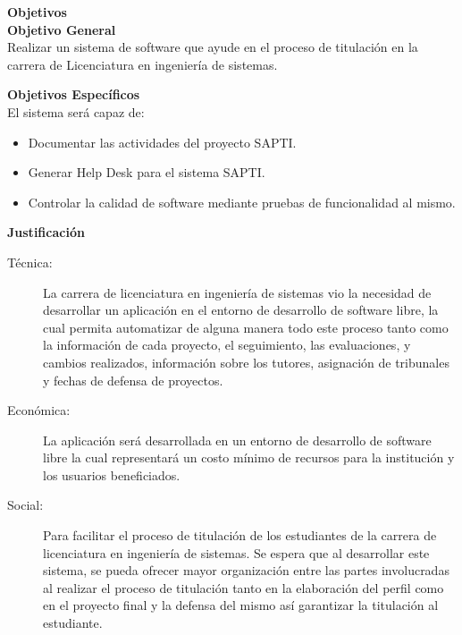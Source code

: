 \documentclass[10pt,letterpaper,twoside]{article}
\newcommand{\btext}[1]{
    \vspace{10mm}
    {{\textcolor{titlecolor}{\large{\textbf{\textsf{#1}}}}}}
    \vspace{5mm}
    \\
}
\newcommand{\ctext}[1]{
    \vspace{5mm}
    {{\textcolor{titlecolor}{\large{\textbf{\textsf{#1}}}}}}
    \\
}
\begin{document}
\begin{multicols}{2}
\btext{Objetivos}

\ctext{Objetivo General}
Realizar un sistema de software que ayude en el proceso de titulación en la carrera de Licenciatura en ingeniería de sistemas.

\ctext{Objetivos Específicos}
El sistema será capaz de:
\begin{itemize}
    \item Documentar las actividades del proyecto SAPTI.
    \item Generar Help Desk para el sistema SAPTI.
    \item Controlar la calidad de software mediante pruebas de funcionalidad al mismo.
\end{itemize}

\btext{Justificación}
\begin{description}
    \item [Técnica:] La carrera de licenciatura en ingeniería de sistemas vio la necesidad de desarrollar un aplicación en el entorno de desarrollo de software libre, la cual permita automatizar de alguna manera todo este proceso tanto como la información de cada proyecto, el seguimiento, las evaluaciones, y cambios realizados, información sobre los tutores, asignación de tribunales y fechas de defensa de proyectos.
    \item [Económica:] La aplicación será desarrollada en un entorno de desarrollo de software libre la cual representará un costo mínimo de recursos para la institución y los usuarios beneficiados.
    \item [Social:] Para facilitar el proceso de titulación de los estudiantes de la carrera de licenciatura en ingeniería de sistemas. Se espera que al desarrollar este sistema, se pueda ofrecer mayor organización entre las partes involucradas al realizar el proceso de titulación tanto en la elaboración del perfil como en el proyecto final y la defensa del mismo así garantizar la titulación al estudiante.
\end{description}


\end{multicols}
\end{document}
